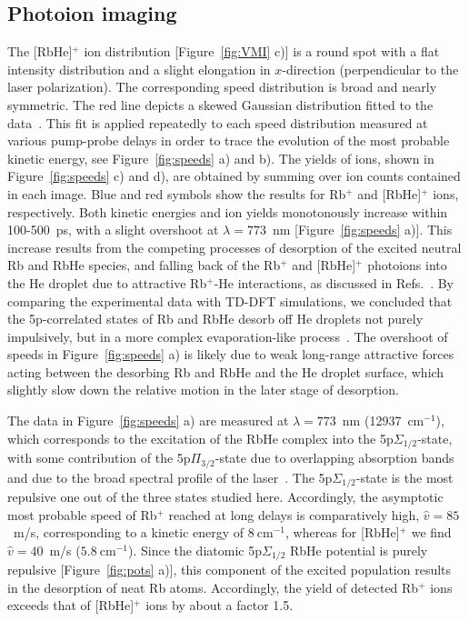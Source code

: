 \subsection{Photoion imaging}
The [RbHe]$^+$ ion distribution [Figure~\ref{fig:VMI} c)] is a round spot with a flat intensity distribution and a slight elongation in $x$-direction (perpendicular to the laser polarization). The corresponding speed distribution is broad and nearly symmetric. The red line depicts a skewed Gaussian distribution fitted to the data~\cite{mudholkar2000epsilon}. This fit is applied repeatedly to each speed distribution measured at various pump-probe delays in order to trace the evolution of the most probable kinetic energy, see Figure~\ref{fig:speeds} a) and b). The yields of ions, shown in Figure~\ref{fig:speeds} c) and d), are obtained by summing over ion counts contained in each image. Blue and red symbols show the results for Rb$^+$ and [RbHe]$^+$ ions, respectively. Both kinetic energies and ion yields monotonously increase within 100-500~ps, with a slight overshoot at $\lambda=773$~nm [Figure~\ref{fig:speeds} a)]. This increase results from the competing processes of desorption of the excited neutral Rb and RbHe species, and falling back of the Rb$^+$ and [RbHe]$^+$ photoions into the He droplet due to attractive Rb$^+$-He interactions, as discussed in Refs.~\cite{Vangerow:2015,Vangerow:2017}. By comparing the experimental data with TD-DFT simulations, we concluded that the 5p-correlated states of Rb and RbHe desorb off He droplets not purely impulsively, but in a more complex evaporation-like process~\cite{Vangerow:2017}. The overshoot of speeds in Figure~\ref{fig:speeds} a) is likely due to weak long-range attractive forces acting between the desorbing Rb and RbHe and the He droplet surface, which slightly slow down the relative motion in the later stage of desorption.

The data in Figure~\ref{fig:speeds} a) are measured at $\lambda=773$~nm (12937~cm$^{-1}$), which corresponds to the excitation of the RbHe complex into the 5p$\Sigma_{1/2}$-state, with some contribution of the 5p$\Pi_{3/2}$-state due to overlapping absorption bands and due to the broad spectral profile of the laser~\cite{Stienkemeier:1996,Bruehl:2001,Callegari:2011}. The 5p$\Sigma_{1/2}$-state is the most repulsive one out of the three states studied here. Accordingly, the asymptotic most probable speed of Rb$^+$ reached at long delays is comparatively high, $\hat{v}=85$~m/s, corresponding to a kinetic energy of $8~$cm$^{-1}$, whereas for [RbHe]$^+$ we find $\hat{v}=40$~m/s ($5.8~$cm$^{-1}$). Since the diatomic 5p$\Sigma_{1/2}$ RbHe potential is purely repulsive [Figure~\ref{fig:pots} a)], this component of the excited population results in the desorption of neat Rb atoms. Accordingly, the yield of detected Rb$^+$ ions exceeds that of [RbHe]$^+$ ions by about a factor 1.5. 

